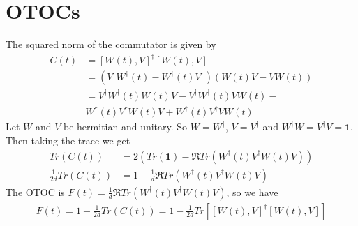 \section{OTOCs}
\label{App:B}
The squared norm of the commutator is given by
\begin{align}
    C(t)&=[W(t),V]^\dagger [W(t),V]\nonumber\\
    &=\left(V^\dagger W^\dagger(t)-W^\dagger(t) V^\dagger\right)\left(W(t)V-VW(t)\right)\nonumber\\
    &=V^\dagger W^\dagger(t) W(t)V-V^\dagger W^\dagger(t)V W(t)-\nonumber\\&W^\dagger(t)V^\dagger W(t)V+W^\dagger(t)V^\dagger V W(t)
\end{align}
Let $W$ and $V$ be hermitian and unitary. So $W=W^\dagger$, $V=V^\dagger$ and $W^\dagger W=V^\dagger V=\mathbf{1}$. Then taking the trace we get
\begin{align}
    Tr(C(t))&=2(Tr(\mathbf{1})-\Re Tr(W^\dagger(t) V^\dagger W(t) V))\nonumber\\
    \frac{1}{2d}Tr(C(t))&=1-\frac{1}{d} \Re Tr(W^\dagger(t) V^\dagger W(t) V)
\end{align}
The OTOC is $F(t)=\frac{1}{d}\Re Tr(W^\dagger(t) V^\dagger W(t) V)$, so we have 
\begin{align}
    F(t)= 1 - \frac{1}{2d}Tr(C(t))=1-\frac{1}{2d}Tr\left[[W(t),V]^\dagger [W(t),V]\right]
\end{align}